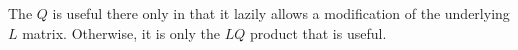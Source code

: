 \documentclass[11pt]{article}
\begin{document}
The $Q$ is useful there only in that it lazily allows a modification of the underlying $L$ matrix.  Otherwise, it is only the $L Q$ product that is useful.  

%
%
%
\end{document}
